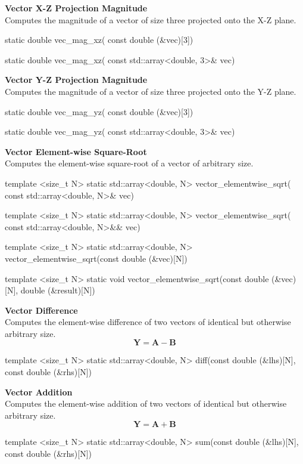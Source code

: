 \documentclass[11pt,fleqn]{report}
\begin{document}
\textbf{Vector X-Z Projection Magnitude}\\
Computes the magnitude of a vector of size three projected onto the X-Z plane.
\begin{code}
static double vec_mag_xz( const double (&vec)[3])

static double vec_mag_xz( const std::array<double, 3>& vec)
\end{code}

\textbf{Vector Y-Z Projection Magnitude}\\
Computes the magnitude of a vector of size three projected onto the Y-Z plane.
\begin{code}
static double vec_mag_yz( const double (&vec)[3])

static double vec_mag_yz( const std::array<double, 3>& vec)
\end{code}

\textbf{Vector Element-wise Square-Root}\\
Computes the element-wise square-root of a vector of arbitrary size.
\begin{code}
template <size_t N>
static std::array<double, N> vector_elementwise_sqrt(
                                        const std::array<double, N>& vec)

template <size_t N>
static std::array<double, N> vector_elementwise_sqrt(
                                        const std::array<double, N>&& vec)

template <size_t N>
static std::array<double, N> vector_elementwise_sqrt(const double (&vec)[N])

template <size_t N>
static void vector_elementwise_sqrt(const double (&vec)[N],
                                        double (&result)[N])
\end{code}

\textbf{Vector Difference}\\
Computes the element-wise difference of two vectors of identical but otherwise
arbitrary size.
\begin{equation*}
\textbf{Y} = \textbf{A} - \textbf{B}
\end{equation*}
\begin{code}
template <size_t N>
static std::array<double, N> diff(const double (&lhs)[N],
                                  const double (&rhs)[N])
\end{code}

\textbf{Vector Addition}\\
Computes the element-wise addition of two vectors of identical but otherwise
arbitrary size.
\begin{equation*}
\textbf{Y} = \textbf{A} + \textbf{B}
\end{equation*}
\begin{code}
template <size_t N>
static std::array<double, N> sum(const double (&lhs)[N],
                                 const double (&rhs)[N])
\end{code}
\end{document}
